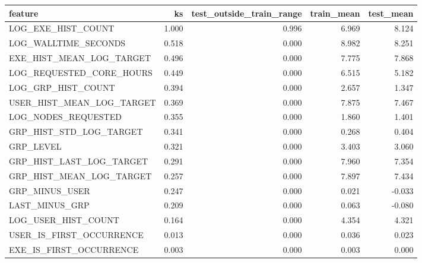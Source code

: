 \begin{tabular}{lrrrr}
\toprule
feature & ks & test_outside_train_range & train_mean & test_mean \\
\midrule
LOG_EXE_HIST_COUNT & 1.000 & 0.996 & 6.969 & 8.124 \\
LOG_WALLTIME_SECONDS & 0.518 & 0.000 & 8.982 & 8.251 \\
EXE_HIST_MEAN_LOG_TARGET & 0.496 & 0.000 & 7.775 & 7.868 \\
LOG_REQUESTED_CORE_HOURS & 0.449 & 0.000 & 6.515 & 5.182 \\
LOG_GRP_HIST_COUNT & 0.394 & 0.000 & 2.657 & 1.347 \\
USER_HIST_MEAN_LOG_TARGET & 0.369 & 0.000 & 7.875 & 7.467 \\
LOG_NODES_REQUESTED & 0.355 & 0.000 & 1.860 & 1.401 \\
GRP_HIST_STD_LOG_TARGET & 0.341 & 0.000 & 0.268 & 0.404 \\
GRP_LEVEL & 0.321 & 0.000 & 3.403 & 3.060 \\
GRP_HIST_LAST_LOG_TARGET & 0.291 & 0.000 & 7.960 & 7.354 \\
GRP_HIST_MEAN_LOG_TARGET & 0.257 & 0.000 & 7.897 & 7.434 \\
GRP_MINUS_USER & 0.247 & 0.000 & 0.021 & -0.033 \\
LAST_MINUS_GRP & 0.209 & 0.000 & 0.063 & -0.080 \\
LOG_USER_HIST_COUNT & 0.164 & 0.000 & 4.354 & 4.321 \\
USER_IS_FIRST_OCCURRENCE & 0.013 & 0.000 & 0.036 & 0.023 \\
EXE_IS_FIRST_OCCURRENCE & 0.003 & 0.000 & 0.003 & 0.000 \\
\bottomrule
\end{tabular}
